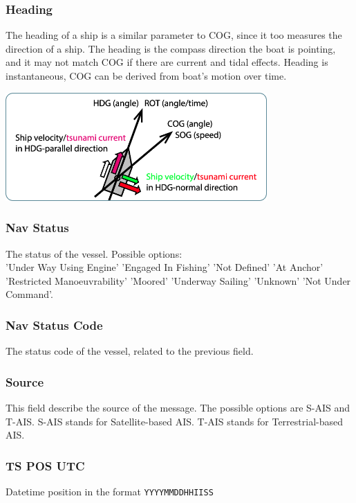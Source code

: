         \subsubsection{Heading}
            The heading of a ship is a similar parameter to COG, since it too measures the direction of a ship. The heading is the compass direction the boat is pointing, and it may not match COG if there are current and tidal effects. Heading is instantaneous, COG can be derived from boat's motion over time.
            \\
            \begin{center}
            \includegraphics[width=10cm]{Images/1/cog-sog.png}
            \end{center}
            
        \subsubsection{Nav Status}
            The status of the vessel. Possible options: \\'Under Way Using Engine' 'Engaged In Fishing' 'Not Defined' 'At Anchor' 'Restricted Manoeuvrability' 'Moored' 'Underway Sailing' 'Unknown' 'Not Under Command'.
        \subsubsection{Nav Status Code}
            The status code of the vessel, related to the previous field.
        \subsubsection{Source}
            This field describe the source of the message. The possible options are S-AIS and T-AIS.
            S-AIS stands for Satellite-based AIS.
            T-AIS stands for Terrestrial-based AIS.
        \subsubsection{TS POS UTC}
            Datetime position in the format \verb|YYYYMMDDHHIISS|
